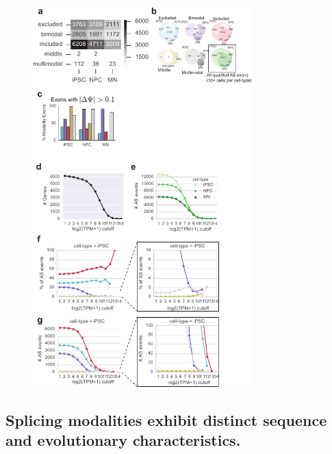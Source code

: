 \begin{figure}[h]
\ContinuedFloat
\captionsetup{labelformat=empty}
\centering
\includegraphics[height=5.8in]{figures/anchor_supplementary.pdf}
\end{figure}
\clearpage


\subsection{Splicing modalities exhibit distinct sequence and evolutionary characteristics.}



